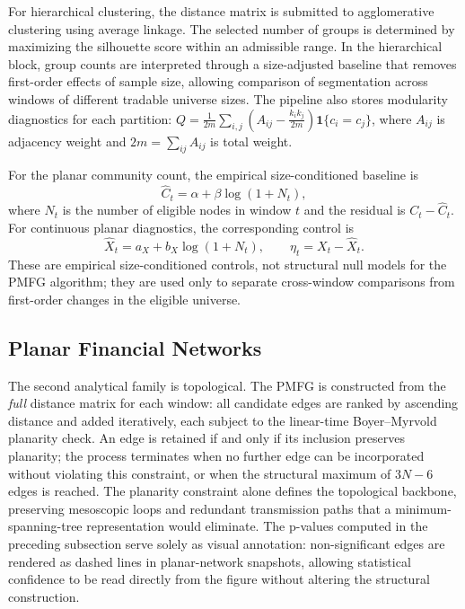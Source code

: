 \documentclass[a4paper,fleqn,review]{cas-sc}
\begin{document}
For hierarchical clustering, the distance matrix is submitted to agglomerative clustering using average linkage. The selected number of groups is determined by maximizing the silhouette score within an admissible range. In the hierarchical block, group counts are interpreted through a size-adjusted baseline that removes first-order effects of sample size, allowing comparison of segmentation across windows of different tradable universe sizes. The pipeline also stores modularity diagnostics for each partition: $Q=\frac{1}{2m}\sum_{i,j}(A_{ij}-\frac{k_i k_j}{2m})\mathbf{1}\{c_i=c_j\}$, where $A_{ij}$ is adjacency weight and $2m=\sum_{ij}A_{ij}$ is total weight.

For the planar community count, the empirical size-conditioned baseline is
\begin{equation}
\label{eq:size_only_null}
\widehat{C}_t=\alpha+\beta\log(1+N_t),
\end{equation}
where $N_t$ is the number of eligible nodes in window $t$ and the residual is $C_t-\widehat{C}_t$. For continuous planar diagnostics, the corresponding control is
\begin{equation}
\label{eq:size_only_topology_null}
\widehat{X}_t=a_X+b_X\log(1+N_t),\qquad \eta_t=X_t-\widehat{X}_t.
\end{equation}
These are empirical size-conditioned controls, not structural null models for the PMFG algorithm; they are used only to separate cross-window comparisons from first-order changes in the eligible universe.

\subsection{Planar Financial Networks}

The second analytical family is topological. The PMFG is constructed from the \emph{full} distance matrix for each window: all candidate edges are ranked by ascending distance and added iteratively, each subject to the linear-time Boyer--Myrvold planarity check. An edge is retained if and only if its inclusion preserves planarity; the process terminates when no further edge can be incorporated without violating this constraint, or when the structural maximum of $3N-6$ edges is reached. The planarity constraint alone defines the topological backbone, preserving mesoscopic loops and redundant transmission paths that a minimum-spanning-tree representation would eliminate. The p-values computed in the preceding subsection serve solely as visual annotation: non-significant edges are rendered as dashed lines in planar-network snapshots, allowing statistical confidence to be read directly from the figure without altering the structural construction.
\end{document}
